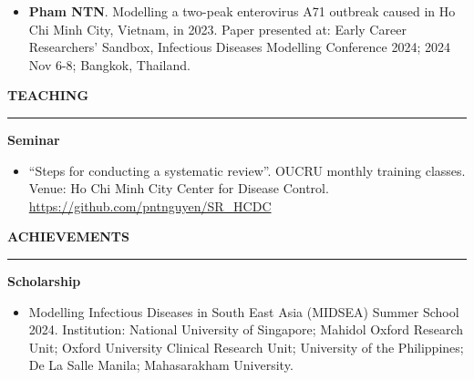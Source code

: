 \documentclass[
  16,
]{article}
\providecommand{\tightlist}{%
  \setlength{\itemsep}{0pt}\setlength{\parskip}{0pt}}\usepackage{longtable,booktabs,array}
\begin{document}
\begin{itemize}
\tightlist
\item
  \textbf{Pham NTN}. Modelling a two-peak enterovirus A71 outbreak
  caused in Ho Chi Minh City, Vietnam, in 2023. Paper presented at:
  Early Career Researchers' Sandbox, Infectious Diseases Modelling
  Conference 2024; 2024 Nov 6-8; Bangkok, Thailand.
\end{itemize}

\vspace{0.05cm}

\begin{large}{\bf TEACHING}
\vspace{3pt}
\hrule
\begin{multicols}{2}
\begin{flushleft}{\bf Seminar}\end{flushleft}
\end{multicols}
\end{large}

\vspace{-0.17cm}

\begin{itemize}
\tightlist
\item
  ``Steps for conducting a systematic review''. OUCRU monthly training
  classes. Venue: Ho Chi Minh City Center for Disease Control.
  \url{https://github.com/pntnguyen/SR_HCDC}
\end{itemize}

\vspace{5cm}

\begin{large}{\bf ACHIEVEMENTS}

\vspace{3pt}

\hrule

\begin{multicols}{2}

\begin{flushleft}{\bf Scholarship}\end{flushleft}

\end{multicols}

\end{large}

\vspace{-0.17cm}

\begin{itemize}
\tightlist
\item
  Modelling Infectious Diseases in South East Asia (MIDSEA) Summer
  School 2024. Institution: National University of Singapore; Mahidol
  Oxford Research Unit; Oxford University Clinical Research Unit;
  University of the Philippines; De La Salle Manila; Mahasarakham
  University.
\end{itemize}

\vspace{-0.16cm}
\end{document}
